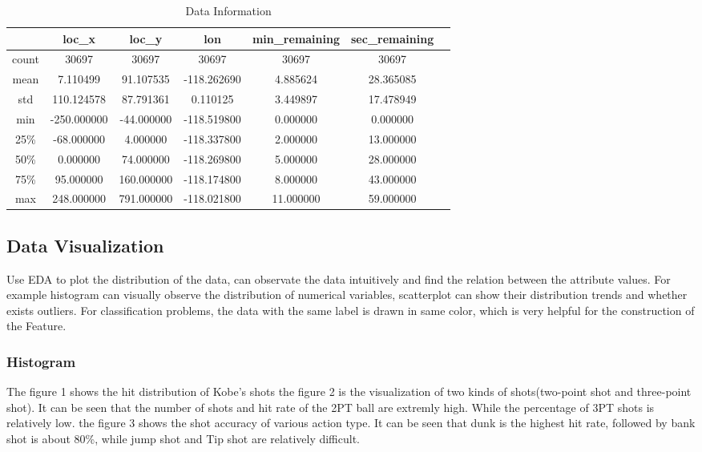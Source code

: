 \begin{table}[htbp]  \centering
	\caption{Data Information}
	\label{tbl:data information}		
	\begin{tabular}{ccccccc}
		\hline
		 & loc\_x & loc\_y & lon & min\_remaining & sec\_remaining \\
		\hline
		count & 30697 & 30697 & 30697 & 30697 & 30697  \\
		mean  & 7.110499	& 91.107535 & -118.262690 & 4.885624 & 28.365085\\
		std 	& 110.124578 & 87.791361 & 0.110125	& 3.449897 & 17.478949  \\
		min 	& -250.000000 & -44.000000 & -118.519800 & 0.000000	& 0.000000  \\
		25\%  & -68.000000 & 4.000000 & -118.337800 & 2.000000 & 13.000000\\
		50\%  & 0.000000	& 74.000000	& -118.269800	& 5.000000	& 28.000000	\\
		75\% & 95.000000 & 160.000000 & -118.174800 & 8.000000 & 43.000000 \\
		max  & 248.000000 & 791.000000 & -118.021800 & 11.000000 & 59.000000 \\
		\hline 
	\end{tabular}
\end{table}



\subsection{Data Visualization}
\DIFdelbegin \DIFdel{\
}\DIFdelend 

Use EDA to plot the distribution of the data,
can observate the data intuitively and
find the relation between the attribute values. 
For example histogram can visually observe 
the distribution of numerical variables, 
scatterplot can show their distribution trends 
and whether exists outliers.
For classification problems, 
the data with the same label is drawn in same color, 
which is very helpful for 
the construction of the Feature.



\subsubsection{ Histogram}
\DIFdelbegin \DIFdel{\
}\DIFdelend 

The figure 1
shows the hit distribution of Kobe's shots  
the figure 2
is the visualization of two kinds of shots(two-point shot and three-point shot).
It can be seen that the number of shots and hit rate of the 2PT ball are extremly high. 
While the percentage of 3PT shots is relatively low.
the figure 3 
shows the shot accuracy of various action type.
It can be seen that dunk is the highest hit rate, followed by bank shot is about 80\%,
while jump shot and Tip shot are relatively difficult.
\DIFaddbegin \newpage
\DIFaddend 


